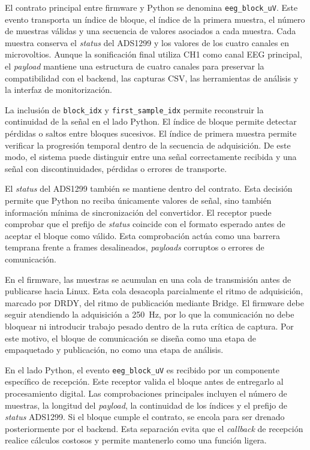 \documentclass[../main.tex]{subfiles}
\begin{document}
El contrato principal entre firmware y Python se denomina \texttt{eeg\_block\_uV}. Este evento transporta un índice de bloque, el índice de la primera muestra, el número de muestras válidas y una secuencia de valores asociados a cada muestra. Cada muestra conserva el \textit{status} del ADS1299 y los valores de los cuatro canales en microvoltios. Aunque la sonificación final utiliza CH1 como canal EEG principal, el \textit{payload} mantiene una estructura de cuatro canales para preservar la compatibilidad con el backend, las capturas CSV, las herramientas de análisis y la interfaz de monitorización.

La inclusión de \texttt{block\_idx} y \texttt{first\_sample\_idx} permite reconstruir la continuidad de la señal en el lado Python. El índice de bloque permite detectar pérdidas o saltos entre bloques sucesivos. El índice de primera muestra permite verificar la progresión temporal dentro de la secuencia de adquisición. De este modo, el sistema puede distinguir entre una señal correctamente recibida y una señal con discontinuidades, pérdidas o errores de transporte.

El \textit{status} del ADS1299 también se mantiene dentro del contrato. Esta decisión permite que Python no reciba únicamente valores de señal, sino también información mínima de sincronización del convertidor. El receptor puede comprobar que el prefijo de \textit{status} coincide con el formato esperado antes de aceptar el bloque como válido. Esta comprobación actúa como una barrera temprana frente a frames desalineados, \textit{payloads} corruptos o errores de comunicación.

En el firmware, las muestras se acumulan en una cola de transmisión antes de publicarse hacia Linux. Esta cola desacopla parcialmente el ritmo de adquisición, marcado por DRDY, del ritmo de publicación mediante Bridge. El firmware debe seguir atendiendo la adquisición a \SI{250}{\hertz}, por lo que la comunicación no debe bloquear ni introducir trabajo pesado dentro de la ruta crítica de captura. Por este motivo, el bloque de comunicación se diseña como una etapa de empaquetado y publicación, no como una etapa de análisis.

En el lado Python, el evento \texttt{eeg\_block\_uV} es recibido por un componente específico de recepción. Este receptor valida el bloque antes de entregarlo al procesamiento digital. Las comprobaciones principales incluyen el número de muestras, la longitud del \textit{payload}, la continuidad de los índices y el prefijo de \textit{status} ADS1299. Si el bloque cumple el contrato, se encola para ser drenado posteriormente por el backend. Esta separación evita que el \textit{callback} de recepción realice cálculos costosos y permite mantenerlo como una función ligera.
\end{document}
